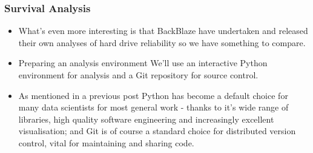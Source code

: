 	\begin{frame}
		\frametitle{Survival Analysis}
		\begin{itemize}
			\item What's even more interesting is that BackBlaze have undertaken and released their own analyses of hard drive reliability so we have something to compare.
			
			\item Preparing an analysis environment
			We'll use an interactive Python environment for analysis and a Git repository for source control. 
			
			\item 	As mentioned in a previous post Python has become a default choice for many data scientists for most general work - thanks to it's wide range of libraries, high quality software engineering and increasingly excellent visualisation; and Git is of course a standard choice for distributed version control, vital for maintaining and sharing code.
			
		\end{itemize}
		
	\end{frame}